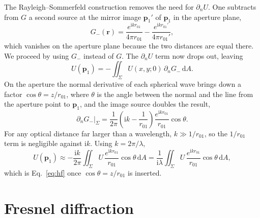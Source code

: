 \documentclass[11pt]{book}
\begin{document}
The Rayleigh--Sommerfeld construction removes the need for $\partial_n U$. One subtracts from $G$ a second source at the mirror image $\mathbf{p}_1'$ of $\mathbf{p}_1$ in the aperture plane,
\begin{equation}
G_-(\mathbf{r}) = \frac{e^{\mathrm{i}kr_{01}}}{4\pi r_{01}} - \frac{e^{\mathrm{i}kr_{01}'}}{4\pi r_{01}'},
\end{equation}
which vanishes on the aperture plane because the two distances are equal there. We proceed by using $G_-$ instead of $G$. The $\partial_n U$ term now drops out, leaving
\begin{equation}
U(\mathbf{p}_1) = -\iint_\Sigma U(x,y;0)\,\partial_n G_-\,\mathrm{d}A.
\end{equation}
On the aperture the normal derivative of each spherical wave brings down a factor $\cos\theta = z/r_{01}$, where $\theta$ is the angle between the normal and the line from the aperture point to $\mathbf{p}_1$, and the image source doubles the result,
\begin{equation}
\partial_n G_-\big|_\Sigma = \frac{1}{2\pi}\left(\mathrm{i}k - \frac{1}{r_{01}}\right)\frac{e^{\mathrm{i}kr_{01}}}{r_{01}}\cos\theta.
\end{equation}
For any optical distance far larger than a wavelength, $k\gg 1/r_{01}$, so the $1/r_{01}$ term is negligible against $\mathrm{i}k$. Using $k=2\pi/\lambda$,
\begin{equation}
U(\mathbf{p}_1)\approx -\frac{\mathrm{i}k}{2\pi}\iint_\Sigma U\,\frac{e^{\mathrm{i}kr_{01}}}{r_{01}}\cos\theta\,\mathrm{d}A
= \frac{1}{\mathrm{i}\lambda}\iint_\Sigma U\,\frac{e^{\mathrm{i}kr_{01}}}{r_{01}}\cos\theta\,\mathrm{d}A,
\end{equation}
which is Eq.~\eqref{eq:hf} once $\cos\theta = z/r_{01}$ is inserted.

\section{Fresnel diffraction}
\end{document}
